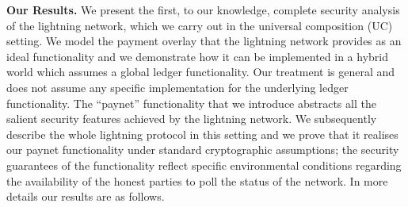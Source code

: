 \noindent \textbf{Our Results.} We present the first, to our knowledge, complete
security analysis of the lightning network, which we carry out in the
universal composition (UC) setting. We model the payment overlay that the
lightning network provides as an ideal functionality and we demonstrate how it
can be implemented in a hybrid world which assumes a global ledger
functionality. Our treatment is general and does not assume any specific
implementation for the underlying ledger functionality. The ``paynet''
functionality that we introduce abstracts all the salient security features
achieved by the lightning network. We subsequently describe the whole lightning
protocol in this setting and we prove that it realises our paynet functionality
under standard cryptographic assumptions; the security guarantees of the
functionality reflect specific environmental conditions regarding the
availability of the honest parties to poll the status of the network. In more
details our results are as follows.

